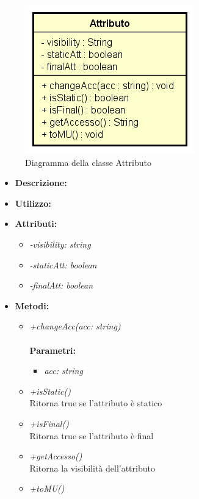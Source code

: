 \begin{figure}[h!]
	\centering
	\includegraphics[scale=0.8]{res/sections/SpecificaFrontEnd/Services/Disegnetti/attributo.png}
	\caption{Diagramma della classe Attributo}
\end{figure}

\begin{itemize}
	\item \textbf{Descrizione:}\\
	
	\item \textbf{Utilizzo:}\\
	
	\item \textbf{Attributi:}
		\begin{itemize}
			\item \emph{-visibility: string}\\
			
			\item \emph{-staticAtt: boolean}\\
			
			\item \emph{-finalAtt: boolean}\\
			
		\end{itemize}
	\item \textbf{Metodi:}
		\begin{itemize}
			\item \emph{+changeAcc(acc: string)}\\
    		\\
    		\textbf{Parametri:}
    		\begin{itemize}
    			\item \emph{acc: string}\\
    			
    		\end{itemize}
    		\item \emph{+isStatic()}\\
    		Ritorna true se l'attributo è statico
    		\item \emph{+isFinal()}\\
    		Ritorna true se l'attributo è final
    		\item \emph{+getAccesso()}\\
    		Ritorna la visibilità dell'attributo
    		\item \emph{+toMU()}\\
    		
    	\end{itemize}
\end{itemize}